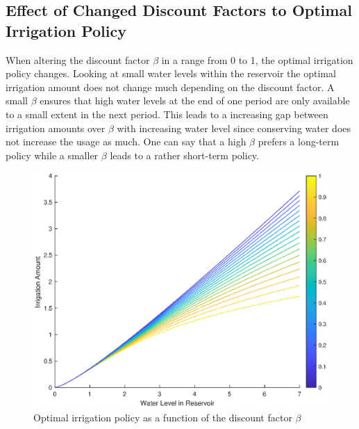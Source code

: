 \documentclass[12pt, a4paper, oneside]{article}
\begin{document}
\subsection{Effect of Changed Discount Factors to Optimal Irrigation Policy}
When altering the discount factor $\beta$ in a range from 0 to 1, the optimal irrigation policy changes.
Looking at small water levels within the reservoir the optimal irrigation amount does not change much depending on the discount factor.
A small $\beta$ ensures that high water levels at the end of one period are only available to a small extent in the next period. 
This leads to a increasing gap between irrigation amounts over $\beta$ with increasing water level since conserving water does not increase the usage as much.
One can say that a high $\beta$ prefers a long-term policy while a smaller $\beta$ leads to a rather short-term policy.
\begin{figure}[ht]
	\includegraphics[width=1\textwidth]{figures/optimum-policy-over-beta.eps}
	\caption{Optimal irrigation policy as a function of the discount factor $\beta$}
	\label{fig:optimal-irrigation-beta}
\end{figure}
\newpage
\end{document}
